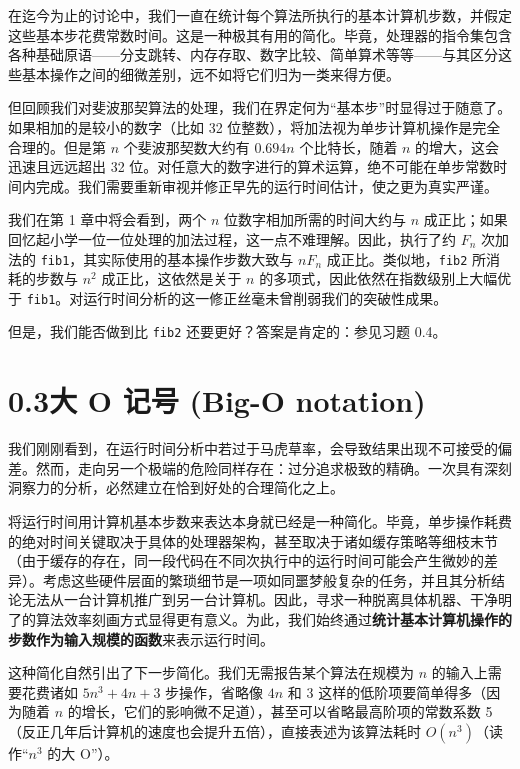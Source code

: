 在迄今为止的讨论中，我们一直在统计每个算法所执行的基本计算机步数，并假定这些基本步花费常数时间。这是一种极其有用的简化。毕竟，处理器的指令集包含各种基础原语——分支跳转、内存存取、数字比较、简单算术等等——与其区分这些基本操作之间的细微差别，远不如将它们归为一类来得方便。

但回顾我们对斐波那契算法的处理，我们在界定何为“基本步”时显得过于随意了。如果相加的是较小的数字（比如 32 位整数），将加法视为单步计算机操作是完全合理的。但是第 $n$ 个斐波那契数大约有 $0.694n$ 个比特长，随着 $n$ 的增大，这会迅速且远远超出 32 位。对任意大的数字进行的算术运算，绝不可能在单步常数时间内完成。我们需要重新审视并修正早先的运行时间估计，使之更为真实严谨。

我们在第 1 章中将会看到，两个 $n$ 位数字相加所需的时间大约与 $n$ 成正比；如果回忆起小学一位一位处理的加法过程，这一点不难理解。因此，执行了约 $F_n$ 次加法的 \texttt{fib1}，其实际使用的基本操作步数大致与 $n F_n$ 成正比。类似地，\texttt{fib2} 所消耗的步数与 $n^2$ 成正比，这依然是关于 $n$ 的多项式，因此依然在指数级别上大幅优于 \texttt{fib1}。对运行时间分析的这一修正丝毫未曾削弱我们的突破性成果。

但是，我们能否做到比 \texttt{fib2} 还要更好？答案是肯定的：参见习题 0.4。

\section*{0.3\quad 大 O 记号 (Big-O notation)}

我们刚刚看到，在运行时间分析中若过于马虎草率，会导致结果出现不可接受的偏差。然而，走向另一个极端的危险同样存在：过分追求极致的精确。一次具有深刻洞察力的分析，必然建立在恰到好处的合理简化之上。

将运行时间用计算机基本步数来表达本身就已经是一种简化。毕竟，单步操作耗费的绝对时间关键取决于具体的处理器架构，甚至取决于诸如缓存策略等细枝末节（由于缓存的存在，同一段代码在不同次执行中的运行时间可能会产生微妙的差异）。考虑这些硬件层面的繁琐细节是一项如同噩梦般复杂的任务，并且其分析结论无法从一台计算机推广到另一台计算机。因此，寻求一种脱离具体机器、干净明了的算法效率刻画方式显得更有意义。为此，我们始终通过\textbf{统计基本计算机操作的步数作为输入规模的函数}来表示运行时间。

这种简化自然引出了下一步简化。我们无需报告某个算法在规模为 $n$ 的输入上需要花费诸如 $5n^3 + 4n + 3$ 步操作，省略像 $4n$ 和 $3$ 这样的低阶项要简单得多（因为随着 $n$ 的增长，它们的影响微不足道），甚至可以省略最高阶项的常数系数 5（反正几年后计算机的速度也会提升五倍），直接表述为该算法耗时 $O(n^3)$（读作“$n^3$ 的大 O”）。

